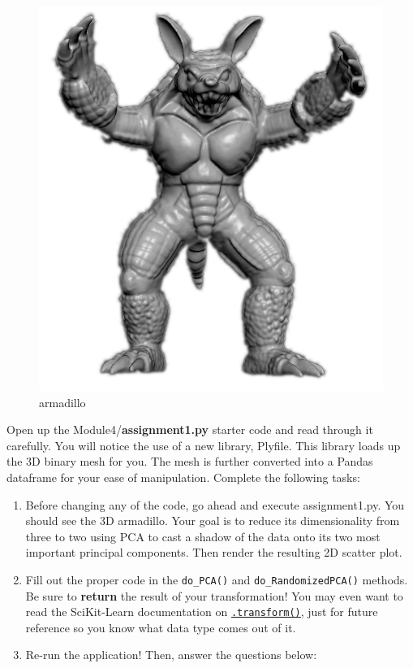 \documentclass[11pt]{article}
\makeatletter
\def\maxwidth{\ifdim\Gin@nat@width>\linewidth\linewidth
    \else\Gin@nat@width\fi}
\let\Oldincludegraphics\includegraphics
\renewcommand{\includegraphics}[1]{\Oldincludegraphics[width=.8\maxwidth]{#1}}
\providecommand{\tightlist}{%
      \setlength{\itemsep}{0pt}\setlength{\parskip}{0pt}}
\makeatother
\begin{document}
\begin{figure}
\centering
\includegraphics{pic/armadillo.png}
\caption{armadillo}
\end{figure}

Open up the Module4/\textbf{assignment1.py} starter code and read
through it carefully. You will notice the use of a new library, Plyfile.
This library loads up the 3D binary mesh for you. The mesh is further
converted into a Pandas dataframe for your ease of manipulation.
Complete the following tasks:

\begin{enumerate}
\def\labelenumi{\arabic{enumi}.}
\tightlist
\item
  Before changing any of the code, go ahead and execute assignment1.py.
  You should see the 3D armadillo. Your goal is to reduce its
  dimensionality from three to two using PCA to cast a shadow of the
  data onto its two most important principal components. Then render the
  resulting 2D scatter plot.
\item
  Fill out the proper code in the \texttt{do\_PCA()} and
  \texttt{do\_RandomizedPCA()} methods. Be sure to \textbf{return} the
  result of your transformation! You may even want to read the
  SciKit-Learn documentation on
  \href{http://scikit-learn.org/stable/modules/generated/sklearn.decomposition.PCA.html\#sklearn.decomposition.PCA.transform}{\texttt{.transform()}},
  just for future reference so you know what data type comes out of it.
\item
  Re-run the application! Then, answer the questions below:
\end{enumerate}
\end{document}
